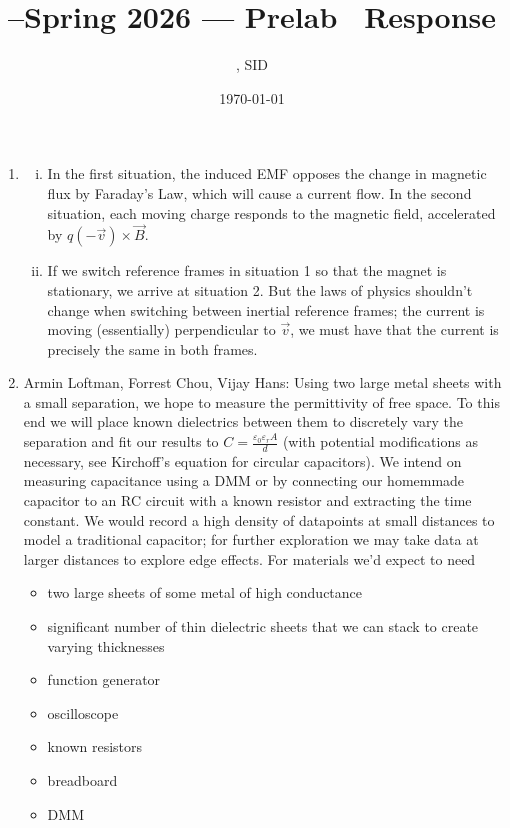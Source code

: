 \documentclass[11pt]{article}
\title{\Cls--Spring 2026 --- Prelab \Prelab \ Response}
\author{\Name, SID \SID}
\date{\today}
\begin{document}
\maketitle

\begin{enumerate}

    \item \begin{enumerate}[(i)]
              \item In the first situation, the induced EMF opposes the change in magnetic flux by Faraday's Law, which will cause a current flow. In the second situation, each moving charge responds to the magnetic field, accelerated by $q(-\vec{v}) \times \vec{B}$.
              \item If we switch reference frames in situation 1 so that the magnet is stationary, we arrive at situation 2. But the laws of physics shouldn't change when switching between inertial reference frames; the current is moving (essentially) perpendicular to $\vec{v}$, we must have that the current is precisely the same in both frames.
          \end{enumerate}
    \item Armin Loftman, Forrest Chou, Vijay Hans: Using two large metal sheets with a small separation, we hope to measure the permittivity of free space. To this end we will place known dielectrics between them to discretely vary the separation and fit our results to $C = \frac{\varepsilon_0 \varepsilon_r A}{d}$ (with potential modifications as necessary, see Kirchoff's equation for circular capacitors). We intend on measuring capacitance using a DMM or by connecting our homemmade capacitor to an RC circuit with a known resistor and extracting the time constant. We would record a high density of datapoints at small distances to model a traditional capacitor; for further exploration we may take data at larger distances to explore edge effects. For materials we'd expect to need \begin{itemize}
              \item two large sheets of some metal of high conductance
              \item significant number of thin dielectric sheets that we can stack to create varying thicknesses
              \item function generator
              \item oscilloscope
              \item known resistors
              \item breadboard
              \item DMM
          \end{itemize}
\end{enumerate}
\end{document}

